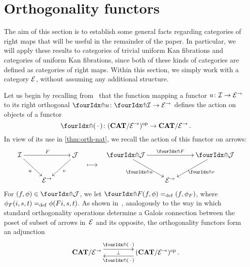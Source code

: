 \documentclass[reqno,10pt,a4paper,oneside,draft]{amsart}
\begin{document}
\section{Orthogonality functors}
\label{sec:ortf}

The aim of this section is to establish some general facts regarding categories of right maps that will be useful in the remainder of the paper.
In particular, we will apply these results to categories of trivial uniform Kan fibrations and categories of uniform Kan fibrations, since both of these kinds of categories are defined as categories of right maps.
Within this section, we simply work with a category $\mathcal{E}$, without assuming any additional structure.

\medskip

Let us begin by recalling from~\cite{garner:small-object-argument} that the function mapping a functor $u \colon \mathcal{I} \to \mathcal{E}^\to$ to its right orthogonal $\liftr{u} \co \liftr{\cal{I}} \to \catE^\to$ defines the action on objects of a functor
\[
  \liftr{\brarghole} \co (\CAT/\catE^\to)^{\op} \to \CAT/\catE^\to \, .
\]
In view of its use in \cref{thm:orth-nat}, we recall the action of this functor on arrows:
\begin{align*}
\xymatrix{
  \cal{I} \ar[dr]_u \ar[rr]^F & & \cal{J} \ar[dl]^{v} \\
  & \catE^\to
}
&&
\xymatrix{
  \ar@{}[d]|{\textstyle\longmapsto} \\
  {}
}
&&
\xymatrix{
  \liftr{\cal{J}} \ar[dr]_{\liftr{u}} \ar[rr]^{\liftr{F}} & & \liftr{\cal{J}} \ar[dl]^{\liftr{v}} \\
  & \catE^\to
}
\end{align*}
For $(f, \phi) \in \liftr{\cal{J}}$, we let $\liftr{F}(f,\phi) \defeq (f, \phi_F)$, where $\phi_F(i, s, t) =_{\operatorname{def}} \phi(Fi, s, t)$.
As shown in~\cite[Proposition~3.8]{garner:small-object-argument}, analogously to the way in which standard orthogonality operations determine a Galois connection between the poset of subset  of arrows in~$\mathcal{E}$ and its opposite, the orthogonality functors form an adjunction
\begin{equation} \label{garner-adjunction}
\begin{gathered}
\xymatrix@C+2em{
  \CAT/\catE^\to
  \ar@<5pt>[r]^-{\liftl{\brarghole}}
  \ar@{}[r]|-{\bot}
&
  (\CAT/\catE^\to)^{\op} \, .
  \ar@<5pt>[l]^-{\liftr{\brarghole}}
}
\end{gathered}
\end{equation}
\end{document}
